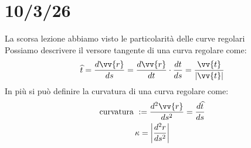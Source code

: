 \documentclass[a4paper, oneside]{article}
\begin{document}
\section{10/3/26}
La scorsa lezione abbiamo visto le particolarità delle curve regolari\\
Possiamo descrivere il versore tangente di una curva regolare come:
\begin{gather*}
    \widehat{t} = \frac{d\vv{r}}{ds} = \frac{d\vv{r}}{dt} \cdot \frac{dt}{ds} = \frac{\vv{t}}{\left\lvert \vv{t} \right\rvert}
\end{gather*}
In più si può definire la curvatura di una curva regolare come:
\begin{gather*}
    \text{curvatura }  :=  \frac{d^2\vv{r}}{ds^2} = \frac{d\widehat{t}}{ds}\\
    \kappa = \left\lvert \frac{d^2r}{ds^2} \right\rvert
\end{gather*}
\end{document}
